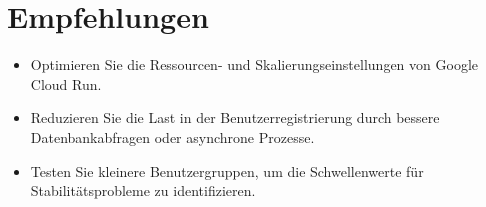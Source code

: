 \section*{Empfehlungen}
\begin{itemize}
    \item Optimieren Sie die Ressourcen- und Skalierungseinstellungen von Google Cloud Run.
    \item Reduzieren Sie die Last in der Benutzerregistrierung durch bessere Datenbankabfragen oder asynchrone Prozesse.
    \item Testen Sie kleinere Benutzergruppen, um die Schwellenwerte für Stabilitätsprobleme zu identifizieren.
\end{itemize}